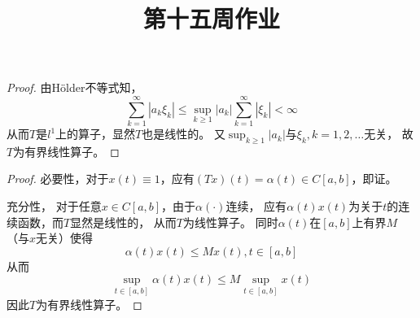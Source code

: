 \documentclass[cn]{homework}
\title{第十五周作业}
\begin{document}
    \maketitle

    \problem
    \begin{proof}
        由H\"older不等式知，
        \[\sum_{k=1}^\infty |a_k\xi_k|
        \leq\sup_{k\geq 1}|a_k|\sum_{k=1}^\infty|\xi_k|<\infty\]
        从而$T$是$l^1$上的算子，显然$T$也是线性的。
        又$\sup_{k\geq 1}|a_k|$与$\xi_k,k=1,2,\ldots$无关，
        故$T$为有界线性算子。

    \end{proof}

    \problem
    \begin{proof}
        必要性，对于$x(t)\equiv 1$，应有$(Tx)(t)=\alpha(t)\in C[a,b]$，即证。
        
        充分性，
        对于任意$x\in C[a,b]$，由于$\alpha(\cdot)$连续，
        应有$\alpha(t)x(t)$为关于$t$的连续函数，而$T$显然是线性的，
        从而$T$为线性算子。
        同时$\alpha(t)$在$[a,b]$上有界$M$（与$x$无关）使得
        \[\alpha(t)x(t)\leq Mx(t),t\in[a,b]\]
        从而
        \[\sup_{t\in[a,b]}\alpha(t)x(t)\leq M\sup_{t\in[a,b]}x(t)\]
        因此$T$为有界线性算子。
    \end{proof}
\end{document}
